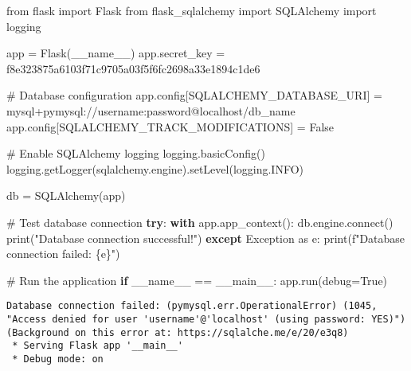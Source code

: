 \documentclass[
  letterpaper,
  DIV=11,
  numbers=noendperiod]{scrreprt}
\newenvironment{Shaded}{\begin{snugshade}}{\end{snugshade}}
\newcommand{\BuiltInTok}[1]{\textcolor[rgb]{0.00,0.23,0.31}{#1}}
\newcommand{\CommentTok}[1]{\textcolor[rgb]{0.37,0.37,0.37}{#1}}
\newcommand{\ControlFlowTok}[1]{\textcolor[rgb]{0.00,0.23,0.31}{\textbf{#1}}}
\newcommand{\ExtensionTok}[1]{\textcolor[rgb]{0.00,0.23,0.31}{#1}}
\newcommand{\ImportTok}[1]{\textcolor[rgb]{0.00,0.46,0.62}{#1}}
\newcommand{\NormalTok}[1]{\textcolor[rgb]{0.00,0.23,0.31}{#1}}
\newcommand{\OperatorTok}[1]{\textcolor[rgb]{0.37,0.37,0.37}{#1}}
\newcommand{\PreprocessorTok}[1]{\textcolor[rgb]{0.68,0.00,0.00}{#1}}
\newcommand{\SpecialCharTok}[1]{\textcolor[rgb]{0.37,0.37,0.37}{#1}}
\newcommand{\SpecialStringTok}[1]{\textcolor[rgb]{0.13,0.47,0.30}{#1}}
\newcommand{\StringTok}[1]{\textcolor[rgb]{0.13,0.47,0.30}{#1}}
\newcommand{\VariableTok}[1]{\textcolor[rgb]{0.07,0.07,0.07}{#1}}
\begin{document}
\begin{Shaded}
\begin{Highlighting}[]
\ImportTok{from}\NormalTok{ flask }\ImportTok{import}\NormalTok{ Flask}
\ImportTok{from}\NormalTok{ flask\_sqlalchemy }\ImportTok{import}\NormalTok{ SQLAlchemy}
\ImportTok{import}\NormalTok{ logging}

\NormalTok{app }\OperatorTok{=}\NormalTok{ Flask(}\VariableTok{\_\_name\_\_}\NormalTok{)}
\NormalTok{app.secret\_key }\OperatorTok{=} \StringTok{\textquotesingle{}f8e323875a6103f71c9705a03f5f6fc2698a33e1894c1de6\textquotesingle{}}

\CommentTok{\# Database configuration}
\NormalTok{app.config[}\StringTok{\textquotesingle{}SQLALCHEMY\_DATABASE\_URI\textquotesingle{}}\NormalTok{] }\OperatorTok{=} \StringTok{\textquotesingle{}mysql+pymysql://username:password@localhost/db\_name\textquotesingle{}}
\NormalTok{app.config[}\StringTok{\textquotesingle{}SQLALCHEMY\_TRACK\_MODIFICATIONS\textquotesingle{}}\NormalTok{] }\OperatorTok{=} \VariableTok{False}

\CommentTok{\# Enable SQLAlchemy logging}
\NormalTok{logging.basicConfig()}
\NormalTok{logging.getLogger(}\StringTok{\textquotesingle{}sqlalchemy.engine\textquotesingle{}}\NormalTok{).setLevel(logging.INFO)}

\NormalTok{db }\OperatorTok{=}\NormalTok{ SQLAlchemy(app)}

\CommentTok{\# Test database connection}
\ControlFlowTok{try}\NormalTok{:}
    \ControlFlowTok{with}\NormalTok{ app.app\_context():}
\NormalTok{        db.engine.}\ExtensionTok{connect}\NormalTok{()}
        \BuiltInTok{print}\NormalTok{(}\StringTok{"Database connection successful!"}\NormalTok{)}
\ControlFlowTok{except} \PreprocessorTok{Exception} \ImportTok{as}\NormalTok{ e:}
    \BuiltInTok{print}\NormalTok{(}\SpecialStringTok{f"Database connection failed: }\SpecialCharTok{\{}\NormalTok{e}\SpecialCharTok{\}}\SpecialStringTok{"}\NormalTok{)}

\CommentTok{\# Run the application}
\ControlFlowTok{if} \VariableTok{\_\_name\_\_} \OperatorTok{==} \StringTok{\textquotesingle{}\_\_main\_\_\textquotesingle{}}\NormalTok{:}
\NormalTok{    app.run(debug}\OperatorTok{=}\VariableTok{True}\NormalTok{)}
\end{Highlighting}
\end{Shaded}

\begin{verbatim}
Database connection failed: (pymysql.err.OperationalError) (1045, "Access denied for user 'username'@'localhost' (using password: YES)")
(Background on this error at: https://sqlalche.me/e/20/e3q8)
 * Serving Flask app '__main__'
 * Debug mode: on
\end{verbatim}
\end{document}
